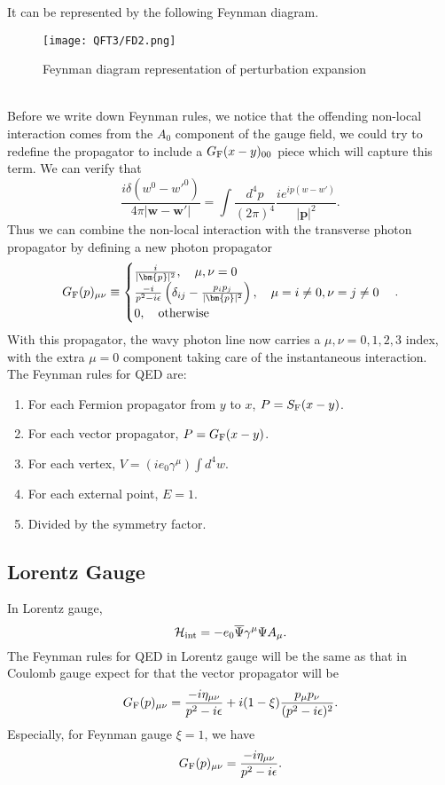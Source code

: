 It can be represented by the following Feynman diagram.
\begin{figure}[!h]
\centering
\texttt{[image: QFT3/FD2.png]}
\caption{Feynman diagram representation of perturbation expansion}
\end{figure}
\\
Before we write down Feynman rules, we notice that the offending non-local interaction comes from the $A_0$ component of the gauge field, we could try to redefine the propagator to include a $G_{\rm F}(x-y)_{00}$ piece which will capture this term. We can verify that
\[\frac{i\delta(w^0-w'^0)}{4\pi|\bm{w}-\bm{w}'|} = \int \frac{d^4p}{(2\pi)^4} \frac{ie^{ip(w-w')}}{|\bm{p}|^2}.\]
Thus we can combine the non-local interaction with the transverse photon propagator by defining a new photon propagator
\[G_{\rm F}(p)_{\mu\nu} \equiv \begin{cases} \frac{i}{|\bm{p}|^2} , \quad \mu,\nu=0\\  \frac{-i}{p^2-i\epsilon} \left(\delta_{ij} - \frac{p_ip_j}{|\bm{p}|^2}\right) , \quad \mu = i \neq 0, \nu = j \neq 0 \\ 0 , \quad \mbox{otherwise} \end{cases} .\]
With this propagator, the wavy photon line now carries a $\mu,\nu = 0,1,2,3$ index, with the extra $\mu=0$ component taking care of the instantaneous interaction.\\
The Feynman rules for QED are:
\begin{enumerate}
\item For each Fermion propagator from $y$ to $x$, $P = S_{\rm F}(x-y)$.
\item For each vector propagator, $P = G_{\rm F}(x-y)$.
\item For each vertex, $V = (ie_0\gamma^{\mu})\int d^4w$.
\item For each external point, $E=1$.
\item Divided by the symmetry factor.
\end{enumerate}

\subsection{Lorentz Gauge}
\noindent
In Lorentz gauge,
\[\mathcal{H}_{\rm int} = -e_0 \overline{\Psi} \gamma^{\mu} \Psi A_{\mu}.\]
The Feynman rules for QED in Lorentz gauge will be the same as that in Coulomb gauge expect for that the vector propagator will be
\[G_{\rm F}(p)_{\mu\nu}  = \frac{-i\eta_{\mu\nu}}{p^2-i\epsilon} + i(1-\xi)\frac{p_{\mu}p_{\nu}}{(p^2-i\epsilon)^2} .\]
Especially, for Feynman gauge $\xi=1$, we have
\[G_{\rm F}(p)_{\mu\nu}  = \frac{-i\eta_{\mu\nu}}{p^2-i\epsilon} .\]

